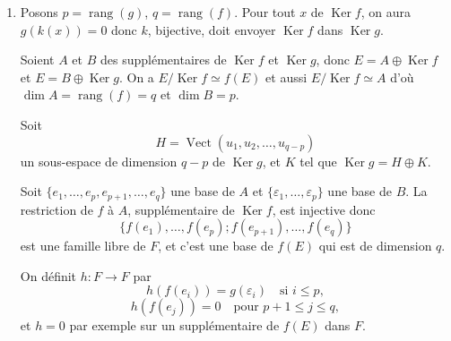 \begin{enumerate}[label=\arabic*.,leftmargin=2.2em,itemsep=1.1em]
Soit alors $x\in\operatorname{Ker}(p+q)$, $p(x)=-q(x)$, d'où l'on tire $p^2(x)=-pq(x)=0$ soit encore $p(x)=0$, donc aussi $q(x)=0$ et $\operatorname{Ker}(p+q)\subset\operatorname{Ker} p\cap\operatorname{Ker} q$. Comme l'autre inclusion est évidente on a
\[
\operatorname{Ker}(p+q)=\operatorname{Ker} p\cap\operatorname{Ker} q.
\]

Par ailleurs, si $y\in\operatorname{Im}(p+q)$, il existe $x\in E$ tel que $y=p(x)+q(x)$ donc $y\in\operatorname{Im}p+\operatorname{Im}q$.

Or si $z\in\operatorname{Im}p\cap\operatorname{Im}q$, on a $p(z)=z$ et $q(z)=z$, comme $pq=0$ on a $pq(z)=z=0$ donc $\operatorname{Im}p$ et $\operatorname{Im}q$ sont en somme directe.

Soit alors $y=u+v\in p(E)\oplus q(E)$. On a $p(u)=u$ et $q(v)=v$ mais aussi $p(v)=0$ et $q(u)=0$ car $pq=0$ implique $q(E)\subset\operatorname{Ker} p$, (et de même $qp=0\Rightarrow p(E)\subset\operatorname{Ker} q$).

Donc
\[
(p+q)(y)=(p+q)(u)+(p+q)(v)=u+v=y,
\]
donc $y\in\operatorname{Im}(p+q)$ d'où
\[
\operatorname{Im}(p+q)=p(E)\oplus q(E).
\]

\item Posons $p=\operatorname{rang}(g)$, $q=\operatorname{rang}(f)$. Pour tout $x$ de $\operatorname{Ker} f$, on aura $g(k(x))=0$ donc $k$, bijective, doit envoyer $\operatorname{Ker} f$ dans $\operatorname{Ker} g$.

Soient $A$ et $B$ des supplémentaires de $\operatorname{Ker} f$ et $\operatorname{Ker} g$, donc $E=A\oplus\operatorname{Ker} f$ et $E=B\oplus\operatorname{Ker} g$. On a $E/\operatorname{Ker} f\simeq f(E)$ et aussi $E/\operatorname{Ker} f\simeq A$ d'où $\dim A=\operatorname{rang}(f)=q$ et $\dim B=p$.

Soit
\[
H=\operatorname{Vect}(u_1,u_2,\ldots,u_{q-p})
\]
un sous-espace de dimension $q-p$ de $\operatorname{Ker} g$, et $K$ tel que $\operatorname{Ker} g=H\oplus K$.

Soit $\{e_1,\ldots,e_p,e_{p+1},\ldots,e_q\}$ une base de $A$ et $\{\varepsilon_1,\ldots,\varepsilon_p\}$ une base de $B$. La restriction de $f$ à $A$, supplémentaire de $\operatorname{Ker} f$, est injective donc
\[
\{f(e_1),\ldots,f(e_p);f(e_{p+1}),\ldots,f(e_q)\}
\]
est une famille libre de $F$, et c'est une base de $f(E)$ qui est de dimension $q$.

On définit $h:F\to F$ par
\[
h(f(e_i))=g(\varepsilon_i)\quad\text{si }i\le p,
\]
\[
h(f(e_j))=0\quad\text{pour }p+1\le j\le q,
\]
et $h=0$ par exemple sur un supplémentaire de $f(E)$ dans $F$.


\end{enumerate}
